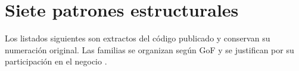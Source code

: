 \section{Siete patrones estructurales}
Los listados siguientes son extractos del código publicado y conservan su numeración original. Las familias se organizan según GoF y se justifican por su participación en el negocio \cite{gof}.








